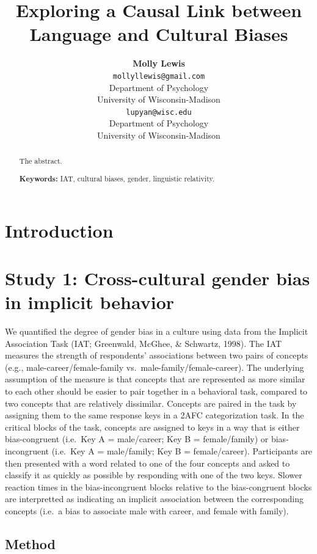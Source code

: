 \documentclass[10pt, letterpaper]{article}
\title{Exploring a Causal Link between Language and Cultural Biases}
\author{{\large \bf Molly Lewis} \\ \texttt{mollyllewis@gmail.com} \\ Department of Psychology  \\ University of Wisconsin-Madison \And {\large \bf Gary Lupyan} \\ \texttt{lupyan@wisc.edu} \\ Department of Psychology  \\ University of Wisconsin-Madison}
\begin{document}
\maketitle

\begin{abstract}
The abstract.

\textbf{Keywords:}
IAT, cultural biases, gender, linguistic relativity.
\end{abstract}

\section{Introduction}\label{introduction}

\section{Study 1: Cross-cultural gender bias in implicit
behavior}\label{study-1-cross-cultural-gender-bias-in-implicit-behavior}

We quantified the degree of gender bias in a culture using data from the
Implicit Association Task (IAT; Greenwald, McGhee, \& Schwartz, 1998).
The IAT measures the strength of respondents' associations between two
pairs of concepts (e.g., male-career/female-family
vs.~male-family/female-career). The underlying assumption of the measure
is that concepts that are represented as more similar to each other
should be easier to pair together in a behavioral task, compared to two
concepts that are relatively dissimilar. Concepts are paired in the task
by assigning them to the same response keys in a 2AFC categorization
task. In the critical blocks of the task, concepts are assigned to keys
in a way that is either bias-congruent (i.e.~Key A = male/career; Key B
= female/family) or bias-incongruent (i.e.~Key A = male/family; Key B =
female/career). Participants are then presented with a word related to
one of the four concepts and asked to classify it as quickly as possible
by responding with one of the two keys. Slower reaction times in the
bias-incongruent blocks relative to the bias-congruent blocks are
interpretted as indicating an implicit association between the
corresponding concepts (i.e.~a bias to associate male with career, and
female with family).

\subsection{Method}\label{method}
\end{document}
